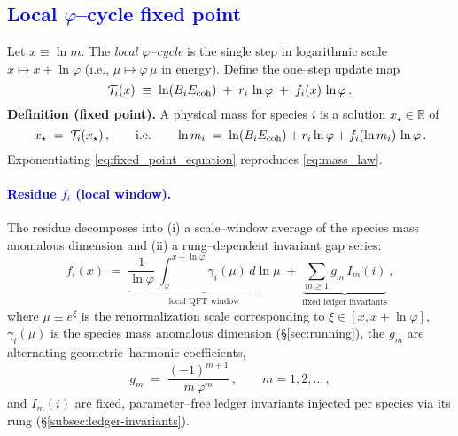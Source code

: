 \documentclass[%
 amsmath,amssymb,
 aps,
prb,
floatfix, showkeys
]{revtex4-2}
\newcommand{\modif}[1]{\textcolor{blue}{#1}}
\begin{document}
{\modif{
\subsection{Local $\varphi$--cycle fixed point}
\label{subsec:local-cycle}
}}
Let $x \equiv \ln m$. The \emph{local $\varphi$–cycle} is the single step in logarithmic scale $x\mapsto x+\ln\varphi$ (i.e., $\mu\mapsto \varphi\,\mu$ in energy). Define the one–step update map
\begin{equation}
  \mathcal{T}_i(x) \;\equiv\; \ln(B_i E_{\rm coh}) \;+\; r_i\,\ln\varphi \;+\; f_i(x)\,\ln\varphi\,.
  \label{eq:T_map}
\end{equation}
\textbf{Definition (fixed point).}
A physical  mass for species $i$ is a solution $x_\star\in\mathbb{R}$ of
\begin{equation}
  x_\star \;=\; \mathcal{T}_i(x_\star)\,,
  \qquad\text{i.e.}\qquad
  \ln m_i \;=\; \ln(B_i E_{\rm coh}) + r_i \ln\varphi + f_i(\ln m_i)\,\ln\varphi\,.
  \label{eq:fixed_point_equation}
\end{equation}
Exponentiating \eqref{eq:fixed_point_equation} reproduces \eqref{eq:mass_law}.

\vspace{0.5cm}
\paragraph{ {\modif{ Residue $f_i$ (local window).}}}  %
The residue decomposes into (i) a scale–window average of the species mass anomalous dimension and
(ii) a rung–dependent invariant gap series:
\begin{equation}
  f_i(x) \;=\; \underbrace{\frac{1}{\ln\varphi}\,\int_{x}^{x+\ln\varphi}\!\gamma_i(\mu)\,d\ln\mu}_{\text{local QFT window}}
  \;+\; \underbrace{\sum_{m\ge 1} g_m\,I_m(i)}_{\text{fixed ledger invariants}}\,,
  \label{eq:residue_local}
\end{equation}
where $\mu \equiv e^{\xi}$ is the renormalization scale corresponding to $\xi\in[x,x+\ln\varphi]$,
$\gamma_i(\mu)$ is the species mass anomalous dimension (\S\ref{sec:running}),
the $g_m$ are alternating geometric–harmonic coefficients,
\begin{equation}
  g_m \;=\; \frac{(-1)^{m+1}}{m\,\varphi^{m}}\,, \qquad m=1,2,\dots\,,
  \label{eq:gap_coeffs}
\end{equation}
and $I_m(i)$ are fixed, parameter–free ledger invariants injected per species via its rung (\S\ref{subsec:ledger-invariants}).
\end{document}
